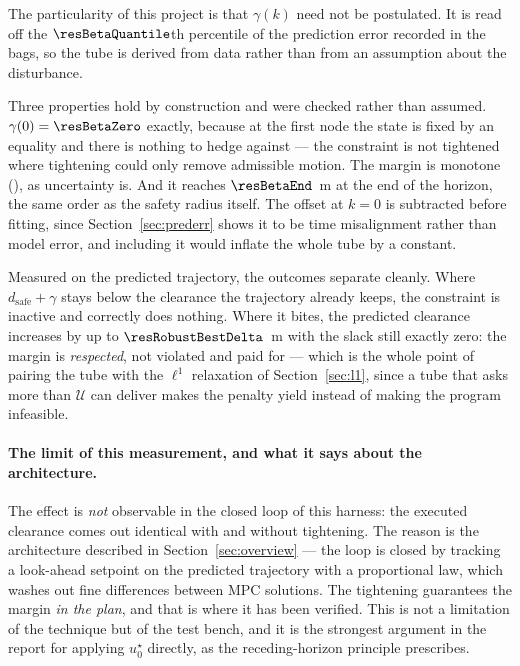 \documentclass[11pt,a4paper]{article}
\newcommand{\dsafe}{d_{\mathrm{safe}}}
\begin{document}
The particularity of this project is that $\gamma(k)$ need not be postulated. It is read off the
$\resBetaQuantile$th percentile of the prediction error recorded in the bags, so the tube is derived from
data rather than from an assumption about the disturbance.

\begin{table}[htbp]
  \centering
  \small
  \caption{%
  Constraint back-off derived from the $95$th percentile of the measured prediction error. The offset at
  $k=0$ is subtracted: it is time misalignment, not model uncertainty, and including it would inflate the
  tube by a constant.}
  \label{res:tab:beta}
\end{table}

Three properties hold by construction and were checked rather than assumed. $\gamma(0)=\resBetaZero$ exactly,
because at the first node the state is fixed by an equality and there is nothing to hedge against --- the
constraint is not tightened where tightening could only remove admissible motion. The margin is monotone
(\resBetaMonotone), as uncertainty is. And it reaches $\resBetaEnd$~m at the end of the horizon, the same
order as the safety radius itself. The offset at $k=0$ is subtracted before fitting, since
Section~\ref{sec:prederr} shows it to be time misalignment rather than model error, and including it would
inflate the whole tube by a constant.

\begin{table}[htbp]
  \centering
  \small
  \caption{%
  Effect of the tightening on the predicted trajectory.}
  \label{res:tab:robust}
\end{table}

Measured on the predicted trajectory, the outcomes separate cleanly. Where $\dsafe+\gamma$ stays below the
clearance the trajectory already keeps, the constraint is inactive and correctly does nothing. Where it
bites, the predicted clearance increases by up to $\resRobustBestDelta$~m with the slack still exactly zero:
the margin is \emph{respected}, not violated and paid for --- which is the whole point of pairing the tube
with the $\ell^1$ relaxation of Section~\ref{sec:l1}, since a tube that asks more than $\mathcal{U}$ can
deliver makes the penalty yield instead of making the program infeasible.

\paragraph{The limit of this measurement, and what it says about the architecture.} The effect is
\emph{not} observable in the closed loop of this harness: the executed clearance comes out identical with and
without tightening. The reason is the architecture described in Section~\ref{sec:overview} --- the loop is
closed by tracking a look-ahead setpoint on the predicted trajectory with a proportional law, which washes
out fine differences between MPC solutions. The tightening guarantees the margin \emph{in the plan}, and that
is where it has been verified. This is not a limitation of the technique but of the test bench, and it is the
strongest argument in the report for applying $u^\star_0$ directly, as the receding-horizon principle
prescribes.
\end{document}

